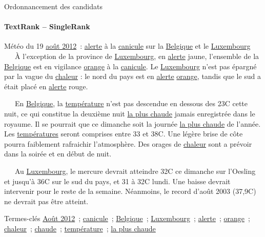   \begin{frame}{Ordonnancement des candidats}\framesubtitle{TextRank -- SingleRank}
    \begin{exampleblock}{\small
      Météo du 19 \underline{août 2012}~: \underline{alerte} à la
      \underline{canicule} sur la \underline{Belgique} et le
      \underline{Luxembourg}
    }\justifying\small
      ~~~À l'exception de la province de \underline{Luxembourg}, en
      \underline{alerte} jaune, l'ensemble de la \underline{Belgique} est en
      vigilance \underline{orange} à la \underline{canicule}. Le
      \underline{Luxembourg} n'est pas épargné par la vague du \underline{chaleur}
      : le nord du pays est en \underline{alerte} \underline{orange}, tandis que
      le sud a était placé en \underline{alerte} rouge.

      ~~~En \underline{Belgique}, la \underline{température} n'est pas descendue
      en dessous des 23\degre{}C cette nuit, ce qui constitue la deuxième nuit
      \underline{la plus chaude} jamais enregistrée dans le royaume. Il se
      pourrait que ce dimanche soit la journée \underline{la plus chaude} de
      l'année. Les \underline{températures} seront comprises entre 33 et
      38\degre{}C. Une légère brise de côte pourra faiblement rafraichir
      l'atmosphère. Des orages de \underline{chaleur} sont a prévoir dans la
      soirée et en début de nuit.

      ~~~Au \underline{Luxembourg}, le mercure devrait atteindre 32\degre{}C ce
      dimanche sur l'Oesling et jusqu'à 36\degre{}C sur le sud du pays, et 31 à
      32\degre{}C lundi. Une baisse devrait intervenir pour le reste de la
      semaine. Néanmoins, le record d'août 2003 (37,9\degre{}C) ne devrait pas
      être atteint.

      \begin{exampleblock}{\small Termes-clés}\justifying\small
        \underline{Août 2012}~; \underline{canicule}~;
        \underline{Belgique}~; \underline{Luxembourg}~; \underline{alerte}~;
        \underline{orange}~; \underline{chaleur}~; \underline{chaude}~;
        \underline{température}~; \underline{la plus chaude}
      \end{exampleblock}
    \end{exampleblock}
  \end{frame}


